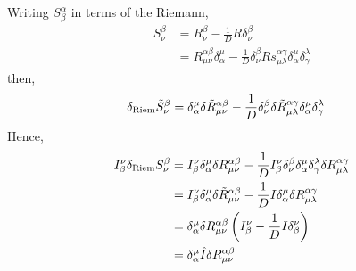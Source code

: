 Writing $S^\alpha_\beta$ in terms of the Riemann,
\begin{align*}
    S^\beta_\nu&=R^\beta_\nu-\frac{1}{D}R\delta^\beta_\nu\\
    &=R^{\alpha\beta}_{\mu\nu}\delta^\mu_\alpha-\frac{1}{D}\delta^\beta_\nu Rs^{\alpha\gamma}_{\mu\lambda}\delta^\mu_\alpha\delta^\lambda_\gamma
\end{align*}
then,
\begin{align*}
    \delta_{\rm Riem}\tilde{S}^\beta_\nu&=\delta^\mu_\alpha\delta\tilde{R}^{\alpha\beta}_{\mu\nu}-\frac{1}{D}\delta^\beta_\nu\delta\tilde{R}^{\alpha\gamma}_{\mu\lambda}\delta^\mu_\alpha \delta^\lambda_\gamma
\end{align*}
Hence,
\begin{align}
   \nonumber I^\nu_\beta\delta_{\rm Riem}S^\beta_\nu&=I^\nu_\beta\delta^\mu_\alpha\delta R^{\alpha\beta}_{\mu\nu}-\frac{1}{D}I^\nu_\beta\delta^\beta_\nu\delta^\mu_\alpha\delta^\lambda_\gamma\delta R^{\alpha\gamma}_{\mu\lambda}\\
    \nonumber&=I^\nu_\beta\delta^\mu_\alpha\delta\tilde{R}^{\alpha\beta}_{\mu\nu}-\frac{1}{D}I\delta^\mu_\alpha\delta R^{\alpha\gamma}_{\mu\lambda}\\
    \nonumber&=\delta^\mu_\alpha\delta R^{\alpha\beta}_{\mu\nu}\left(I^\nu_\beta-\frac{1}{D}I\delta^\nu_\beta\right)\\
    &=\delta^\mu_\alpha\hat{I} \delta R^{\alpha\beta}_{\mu\nu}\label{dela S}
\end{align}

